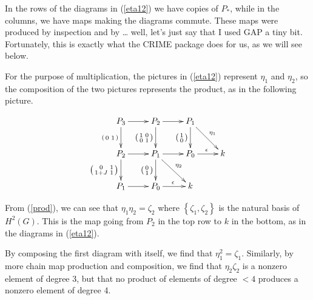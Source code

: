 \documentclass[12pt]{article}
\begin{document}
In the rows of the diagrams in (\ref{eta12}) we have copies
of $P_\ast$, while in the columns, we have maps making the diagrams
commute. These maps were produced by inspection and by \dots
well, let's just say that I used \textsf{GAP} a tiny bit.
Fortunately, this is exactly what the \textsf{CRIME} package
does for us, as we will see below.

For the purpose of multiplication,
the pictures in (\ref{eta12}) represent
$\eta_1$ and $\eta_2$, so the composition
of the two pictures represents the product,
as in the following picture.

\begin{equation}\label{prod}
\begin{xy}\xymatrix{
P_3\ar[r]
\ar[d]_{\left(\begin{smallmatrix}0&1\end{smallmatrix}\right)}
&P_2\ar[r]
\ar[d]_{\left(\begin{smallmatrix}1&0\\0&1\end{smallmatrix}\right)}
&P_1\ar[rd]^{\eta_1}
\ar[d]_{\left(\begin{smallmatrix}1\\0\end{smallmatrix}\right)}\\
P_2\ar[r]
\ar[d]_{\left(\begin{smallmatrix}0&1\\1+J&1\end{smallmatrix}\right)}
&P_1\ar[r]\ar[dr]^{\eta_2}
\ar[d]_{\left(\begin{smallmatrix}0\\1\end{smallmatrix}\right)}
&P_0\ar[r]^\epsilon
&k\\
P_1\ar[r]
&P_0\ar[r]^\epsilon
&k
}\end{xy}
\end{equation}

From (\ref{prod}), we can see that $\eta_1\eta_2=\zeta_2$
where $\left\{\zeta_1,\zeta_2\right\}$ is the natural basis of
$H^2\left(G\right)$.
This is the map going from $P_2$ in the top row to $k$
in the bottom, as in the diagrams in (\ref{eta12}).

By composing the first diagram with itself, we find that
$\eta_1^2=\zeta_1$.
Similarly, by more chain map production and composition,
we find that $\eta_2\zeta_2$ is a nonzero
element of degree 3, but that no product of 
elements of degree $<4$ produces
a nonzero element of degree 4.
\end{document}
